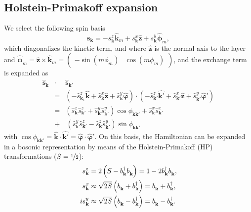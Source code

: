 \documentclass[english,aps,prd,nofootinbib,twocolumn]{revtex4-1}
\begin{document}
\subsection{Holstein-Primakoff expansion}
\label{sect:Supp:Holstein-Primakoff}
We select the following spin basis 
\begin{equation}
\label{eq:Supp:Zeemann-basis}
\mathbf{s}_{\mathbf{k}} = -
s_{\mathbf{k}}^{z}\hat{\mathbf{k}}_{m} + 
s_{\mathbf{k}}^{x} \hat{\mathbf{z}} + 
s_{\mathbf{k}}^{y}\hat{\boldsymbol{\phi}}_{m},
\end{equation}
which diagonalizes the kinetic term, and where $\hat{\mathbf{z}}$ is the normal axis to the layer and $\hat{\boldsymbol{\phi}}_{m}=\hat{\mathbf{z}}\times \hat{\mathbf{k}}_{m} = 
\begin{pmatrix}
-\sin(m\phi_{m})	&	\!\!\cos(m\phi_{m})
\end{pmatrix}$, and the exchange term is expanded as
\begin{eqnarray}
\label{eq:Spin-dot-product-along-k}
\hat{\mathbf{s}}_{\mathbf{k}}\!\! &\cdot& \hat{\mathbf{s}}_{\mathbf{k}'} 
\\ &=& \nonumber 
\left( -\hat{s}_{\mathbf{k}_{1}}^{z} \hat{\mathbf{k}} + \hat{s}_{\mathbf{k }}^{x} \hat{\mathbf{z }} + \hat{s}_{\mathbf{k }}^{y} \hat{\boldsymbol{\varphi}} \right) \cdot \left( -\hat{s}_{\mathbf{k'}}^{z} \hat{\mathbf{k'}} + \hat{s}_{\mathbf{k'}}^{x} \hat{\mathbf{z }} + \hat{s}_{\mathbf{k'}}^{y} \hat{\boldsymbol{\varphi}}'\right) 
\\ &=& \nonumber 
\left(
\hat{s}_{\mathbf{k }}^{z}\hat{s}_{\mathbf{k'}}^{z}+ \hat{s}_{\mathbf{k }}^{y}\hat{s}_{\mathbf{k'}}^{y} \right)\cos \phi_{\mathbf{k}\mathbf{k'}} + 
\hat{s}_{\mathbf{k }}^{x}\hat{s}_{\mathbf{k'}}^{x} 
\\ &+& \,
\left(
\hat{s}_{\mathbf{k }}^{y}\hat{s}_{\mathbf{k'}}^{z}- \hat{s}_{\mathbf{k }}^{z}\hat{s}_{\mathbf{k'}}^{y} \right)\sin \phi_{\mathbf{k}\mathbf{k'}}
\nonumber	
\end{eqnarray}
with $\cos \phi_{\mathbf{k}\mathbf{k'}} = \hat{\mathbf{k }}\cdot\hat{\mathbf{k'}} = \hat{\boldsymbol{\varphi}}\cdot\hat{\boldsymbol{\varphi}}'$. 
On this basis, the Hamiltonian can be expanded in a bosonic representation by means of the Holstein-Primakoff (HP) transformations ($S=\nicefrac{1}{2}$):
\begin{equation}
\label{eq:Holstein-Primakoff}
\begin{split}
s_{\mathbf{k }}^{z} &= 2\left( S - 
b_{\mathbf{k }}^{\textcolor{black}{\dagger}}
b_{\mathbf{k }}^{\textcolor{white}{\dagger}} \right) = 1 - 2 
b_{\mathbf{k }}^{\textcolor{black}{\dagger}}
b_{\mathbf{k }}^{\textcolor{white}{\dagger}}
, \\
s_{\mathbf{k }}^{x}  
&\approx \sqrt{2 S}\left( 
b_{\mathbf{k }}^{\textcolor{white}{\dagger}} + 
b_{\mathbf{k }}^{\textcolor{black}{\dagger}} \right) = 
b_{\mathbf{k }}^{\textcolor{white}{\dagger}} + 
b_{\mathbf{k }}^{\textcolor{black}{\dagger}}
, \\
i s_{\mathbf{k }}^{y}
&\approx \sqrt{2 S}\left( 
b_{\mathbf{k }}^{\textcolor{white}{\dagger}} - 
b_{\mathbf{k }}^{\textcolor{black}{\dagger}} \right) = 
b_{\mathbf{k }}^{\textcolor{white}{\dagger}} - 
b_{\mathbf{k }}^{\textcolor{black}{\dagger}}
.
\end{split}
\end{equation}
\end{document}
